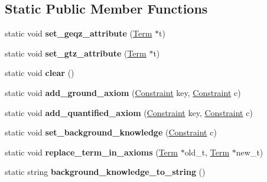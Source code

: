 \subsection*{\-Static \-Public \-Member \-Functions}
\begin{DoxyCompactItemize}
\item 
\hypertarget{classConstraint_ab8cca1b45048e8636c600447779d9a4e}{static void {\bfseries set\-\_\-geqz\-\_\-attribute} (\hyperlink{classTerm}{\-Term} $\ast$t)}\label{classConstraint_ab8cca1b45048e8636c600447779d9a4e}

\item 
\hypertarget{classConstraint_ac8e23416503e7bf0346b2edd9cbc1cd8}{static void {\bfseries set\-\_\-gtz\-\_\-attribute} (\hyperlink{classTerm}{\-Term} $\ast$t)}\label{classConstraint_ac8e23416503e7bf0346b2edd9cbc1cd8}

\item 
\hypertarget{classConstraint_a46d619dde16a00ac444ba79394a38ecd}{static void {\bfseries clear} ()}\label{classConstraint_a46d619dde16a00ac444ba79394a38ecd}

\item 
\hypertarget{classConstraint_a67937d78172d09bcaf40f23b7c710018}{static void {\bfseries add\-\_\-ground\-\_\-axiom} (\hyperlink{classConstraint}{\-Constraint} key, \hyperlink{classConstraint}{\-Constraint} c)}\label{classConstraint_a67937d78172d09bcaf40f23b7c710018}

\item 
\hypertarget{classConstraint_a307d00bfc95bf0daa524859beb86b564}{static void {\bfseries add\-\_\-quantified\-\_\-axiom} (\hyperlink{classConstraint}{\-Constraint} key, \hyperlink{classConstraint}{\-Constraint} c)}\label{classConstraint_a307d00bfc95bf0daa524859beb86b564}

\item 
\hypertarget{classConstraint_af7af81b8220a4c108232700174f04b82}{static void {\bfseries set\-\_\-background\-\_\-knowledge} (\hyperlink{classConstraint}{\-Constraint} c)}\label{classConstraint_af7af81b8220a4c108232700174f04b82}

\item 
\hypertarget{classConstraint_ab4098d783f79be9e34f7ba7e19eae1df}{static void {\bfseries replace\-\_\-term\-\_\-in\-\_\-axioms} (\hyperlink{classTerm}{\-Term} $\ast$old\-\_\-t, \hyperlink{classTerm}{\-Term} $\ast$new\-\_\-t)}\label{classConstraint_ab4098d783f79be9e34f7ba7e19eae1df}

\item 
\hypertarget{classConstraint_a2aab071fed7d175ba5a38df060f737bb}{static string {\bfseries background\-\_\-knowledge\-\_\-to\-\_\-string} ()}\label{classConstraint_a2aab071fed7d175ba5a38df060f737bb}


\end{DoxyCompactItemize}
